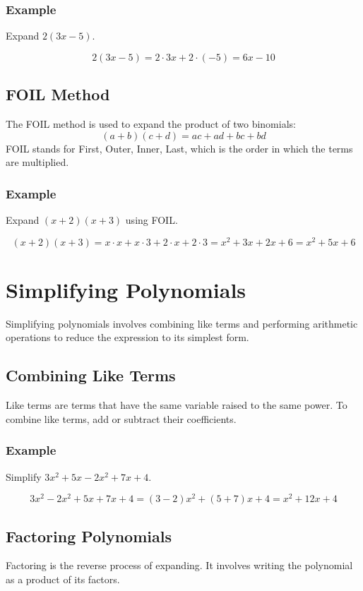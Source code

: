 \documentclass[12pt]{article}
\begin{document}
\subsubsection*{Example}
Expand \( 2(3x - 5) \).

\[
2(3x - 5) = 2 \cdot 3x + 2 \cdot (-5) = 6x - 10
\]

\subsection*{FOIL Method}
The FOIL method is used to expand the product of two binomials:
\[
(a + b)(c + d) = ac + ad + bc + bd
\]
FOIL stands for First, Outer, Inner, Last, which is the order in which the terms are multiplied.

\subsubsection*{Example}
Expand \( (x + 2)(x + 3) \) using FOIL.

\[
(x + 2)(x + 3) = x \cdot x + x \cdot 3 + 2 \cdot x + 2 \cdot 3 = x^2 + 3x + 2x + 6 = x^2 + 5x + 6
\]

\newpage

\section*{Simplifying Polynomials}
Simplifying polynomials involves combining like terms and performing arithmetic operations to reduce the expression to its simplest form.

\subsection*{Combining Like Terms}
Like terms are terms that have the same variable raised to the same power. To combine like terms, add or subtract their coefficients.

\subsubsection*{Example}
Simplify \( 3x^2 + 5x - 2x^2 + 7x + 4 \).

\[
3x^2 - 2x^2 + 5x + 7x + 4 = (3 - 2)x^2 + (5 + 7)x + 4 = x^2 + 12x + 4
\]

\vfill

\subsection*{Factoring Polynomials}
Factoring is the reverse process of expanding. It involves writing the polynomial as a product of its factors.
\end{document}
